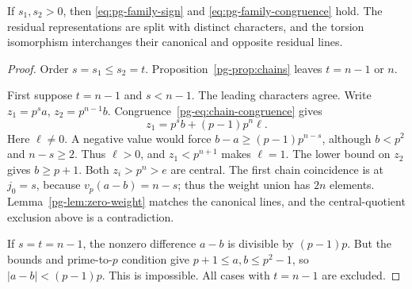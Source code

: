 \begin{proposition}\label{pg-prop:positive}
If $s_1,s_2>0$, then \eqref{eq:pg-family-sign} and \eqref{eq:pg-family-congruence} hold. The residual representations are split with distinct characters, and the torsion isomorphism interchanges their canonical and opposite residual lines.
\end{proposition}
\begin{proof}
Order $s=s_1\le s_2=t$. Proposition~\ref{pg-prop:chains} leaves $t=n-1$ or $n$.

First suppose $t=n-1$ and $s<n-1$. The leading characters agree. Write $z_1=p^sa$, $z_2=p^{n-1}b$. Congruence~\eqref{pg-eq:chain-congruence} gives
\[
 z_1=p^sb+(p-1)p^n\ell.
\]
Here $\ell\ne0$. A negative value would force $b-a\ge(p-1)p^{n-s}$, although $b<p^2$ and $n-s\ge2$. Thus $\ell>0$, and $z_1<p^{n+1}$ makes $\ell=1$. The lower bound on $z_2$ gives $b\ge p+1$. Both $z_i>p^n>e$ are central. The first chain coincidence is at $j_0=s$, because $v_p(a-b)=n-s$; thus the weight union has $2n$ elements. Lemma~\ref{pg-lem:zero-weight} matches the canonical lines, and the central-quotient exclusion above is a contradiction.

If $s=t=n-1$, the nonzero difference $a-b$ is divisible by $(p-1)p$. But the bounds and prime-to-$p$ condition give $p+1\le a,b\le p^2-1$, so $|a-b|<(p-1)p$. This is impossible. All cases with $t=n-1$ are excluded.


\end{proof}

